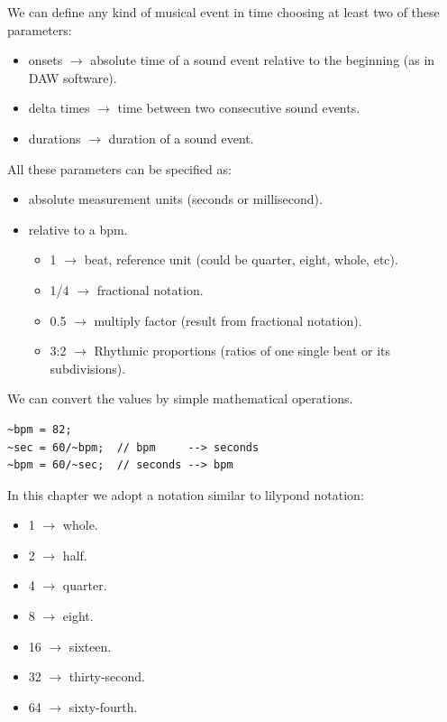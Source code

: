 We can define any kind of musical event in time choosing at least two of these parameters:

\begin{itemize}
\tightlist
\item onsets \(\rightarrow\) absolute time of a sound event relative to the beginning (as in DAW software).
\item delta times \(\rightarrow\) time between two consecutive sound events.
\item durations \(\rightarrow\) duration of a sound event.
\end{itemize}

All these parameters can be specified as:

\begin{itemize}
\tightlist
\item absolute measurement units (seconds or millisecond).
\item relative to a bpm.

  \begin{itemize}
  \tightlist
  \item 1 \(\rightarrow\) beat, reference unit (could be quarter, eight, whole, etc).
  \item 1/4 \(\rightarrow\) fractional notation.
  \item 0.5 \(\rightarrow\) multiply factor (result from fractional notation).
  \item 3:2 \(\rightarrow\) Rhythmic proportions (ratios of one single beat or its subdivisions).
  \end{itemize}
\end{itemize}

We can convert the values by simple mathematical operations.

\begin{lstlisting}[frame=single] 
~bpm = 82;
~sec = 60/~bpm;  // bpm     --> seconds
~bpm = 60/~sec;  // seconds --> bpm          
\end{lstlisting}

In this chapter we adopt a notation similar to lilypond notation:

\begin{itemize}
\tightlist
\item 1 \(\rightarrow\) whole.
\item 2 \(\rightarrow\) half.
\item 4 \(\rightarrow\) quarter.
\item 8 \(\rightarrow\) eight.
\item 16 \(\rightarrow\) sixteen.
\item 32 \(\rightarrow\) thirty-second.
\item 64 \(\rightarrow\) sixty-fourth.
\end{itemize}

